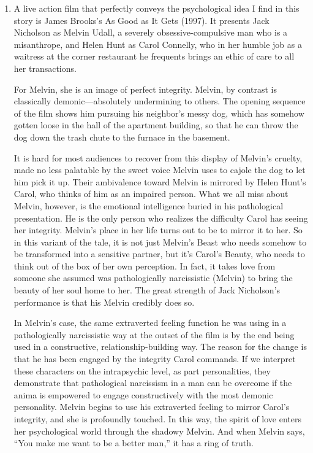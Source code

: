 \begin{enumerate}
\item {} A live action film that perfectly
conveys the psychological idea I find in this story is James Brooks's As Good
as It Gets (1997). It presents Jack Nicholson as Melvin Udall, a severely
obsessive-compulsive man who is a misanthrope, and Helen Hunt as Carol
Connelly, who in her humble job as a waitress at the corner restaurant he
frequents brings an ethic of care to all her transactions.

For Melvin, she is an image of perfect integrity. Melvin, by contrast is
classically demonic—absolutely undermining to others. The opening sequence of
the film shows him pursuing his neighbor's messy dog, which has somehow gotten
loose in the hall of the apartment building, so that he can throw the dog down
the trash chute to the furnace in the basement.

It is hard for most audiences to recover from this display of Melvin's cruelty,
made no less palatable by the sweet voice Melvin uses to cajole the dog to let
him pick it up. Their ambivalence toward Melvin is mirrored by Helen Hunt's
Carol, who thinks of him as an impaired person. What we all miss about Melvin,
however, is the emotional intelligence buried in his pathological presentation.
He is the only person who realizes the difficulty Carol has seeing her
integrity. Melvin's place in her life turns out to be to mirror it to her. So
in this variant of the tale, it is not just Melvin's Beast who needs somehow to
be transformed into a sensitive partner, but it's Carol's Beauty, who needs to
think out of the box of her own perception. In fact, it takes love from someone
she assumed was pathologically narcissistic (Melvin) to bring the beauty of her
soul home to her. The great strength of Jack Nicholson's performance is that
his Melvin credibly does so.

In Melvin's case, the same extraverted feeling function he was using in a
pathologically narcissistic way at the outset of the film is by the end being
used in a constructive, relationship-building way. The reason for the change is
that he has been engaged by the integrity Carol commands. If we interpret these
characters on the intrapsychic level, as part personalities, they demonstrate
that pathological narcissism in a man can be overcome if the anima is empowered
to engage constructively with the most demonic personality. Melvin begins to
use his extraverted feeling to mirror Carol's integrity, and she is profoundly
touched. In this way, the spirit of love enters her psychological world through
the shadowy Melvin. And when Melvin says, ``You make me want to be a better
man,'' it has a ring of truth.


\end{enumerate}
